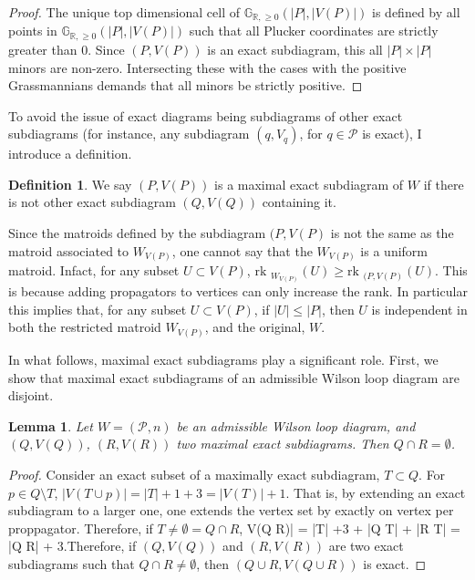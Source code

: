 \documentclass[11pt]{article}
\newcommand{\R}{\mathbb{R}}
\newcommand{\Gr}{\mathbb{G}_{\R, \geq 0}}
\newcommand{\rk}{\textrm{rk }}
\def\bas #1\eas{\begin{align*} #1 \end{align*}}
\newcommand{\cP}{\mathcal{P}}
\newtheorem{lem}[thm]{Lemma}
\theoremstyle{remark}
\theoremstyle{definition}
\newtheorem{dfn}[thm]{Definition}
\begin{document}
\begin{proof}
The unique top dimensional cell of $\Gr(|P|, |V(P)|)$ is defined by all points in $\Gr(|P|, |V(P)|)$ such that all Plucker coordinates are strictly greater than $0$. Since $(P, V(P))$ is an exact subdiagram, this all $|P| \times |P|$ minors are non-zero. Intersecting these with the cases with the positive Grassmannians demands that all minors be strictly positive.
\end{proof}

To avoid the issue of exact diagrams being subdiagrams of other exact subdiagrams (for instance, any subdiagram $(q, V_q)$, for $q \in \cP$ is exact), I introduce a definition.

\begin{dfn}
We say $(P, V(P))$ is a maximal exact subdiagram of $W$ if there is not other exact subdiagram $(Q, V(Q))$ containing it.
\end{dfn}

Since the matroids defined by the subdiagram $(P , V(P)$ is not the same as the matroid associated to $W_{V(P)}$, one cannot say that the $W_{V(P)}$ is a uniform matroid. Infact, for any subset $U \subset V(P)$, $\rk_{W_{V(P)}}(U) \geq \rk_{(P , V(P)}(U)$. This is because adding propagators to vertices can only increase the rank. In particular this implies that, for any subset $U \subset V(P)$, if $|U| \leq |P|$, then $U$ is independent in both the restricted matroid $W_{V(P)}$, and the original, $W$.

In what follows, maximal exact subdiagrams play a significant role. First, we show that maximal exact subdiagrams of an admissible Wilson loop diagram are disjoint.

\begin{lem}
Let $W = (\cP, n)$ be an admissible Wilson loop diagram, and $(Q, V(Q))$, $(R, V(R))$ two maximal exact subdiagrams. Then $Q\cap R = \emptyset$.
\end{lem}

\begin{proof}
Consider an exact subset of a maximally exact subdiagram, $T \subset Q$. For $p \in Q \setminus T$, $|V(T \cup p)| = |T| +1 +3  = |V(T)| +1$. That is, by extending an exact subdiagram to a larger one, one extends the vertex set by exactly on vertex per proppagator. Therefore, if $T \neq \emptyset = Q \cap R$, \bas |V(Q \cup R)| = |T| +3 + |Q \setminus T| + |R \setminus T| = |Q \cup R| + 3\;.\eas Therefore, if $(Q, V(Q))$ and $(R, V(R))$ are two exact subdiagrams such that $Q\cap R \neq \emptyset$, then $(Q \cup R, V(Q \cup R))$ is exact.
\end{proof}
\end{document}
